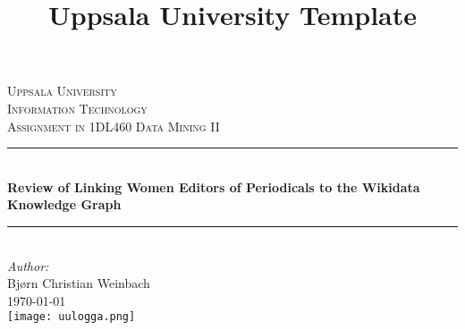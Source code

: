 \documentclass[6pt, twocolumn]{article}
\title{Uppsala University Template}
\begin{document}
\begin{titlepage}

\newcommand{\HRule}{\rule{\linewidth}{0.5mm}} %

\begin{center}
\textsc{\LARGE Uppsala University}\\[1.5cm] %
\textsc{\Large Information Technology}\\[0.5cm] %
\textsc{\large Assignment in 1DL460 Data Mining II}\\[0.5cm] %

\HRule \\[0.4cm]
{ \huge \bfseries Review of Linking Women Editors of Periodicals to the Wikidata Knowledge Graph}\\[0.4cm] %
\HRule \\[1.5cm]
 

\large\emph{Author:}\\ Bjørn Christian Weinbach\\[1.0cm]%




{\large \today}\\[1cm] %

\texttt{[image: uulogga.png]}\\%
\end{center}
\end{titlepage}
\pagebreak

\newpage
\printbibliography
\end{document}
